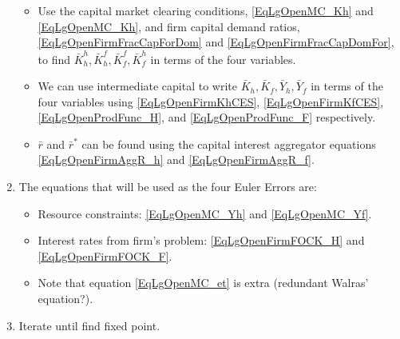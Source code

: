 \documentclass[letterpaper,12pt]{article}
\theoremstyle{definition}
\begin{document}
\begin{enumerate}
\begin{itemize}
        \item Use the capital market clearing conditions, \eqref{EqLgOpenMC_Kh} and \eqref{EqLgOpenMC_Kh}, and firm capital demand ratios,  \eqref{EqLgOpenFirmFracCapForDom} and \eqref{EqLgOpenFirmFracCapDomFor}, to find $\bar{K}_h^h, \bar{K}_h^f, \bar{K}_f^f, \bar{K}_f^h$ in terms of the four variables.
        \item We can use intermediate capital to write $\bar{K}_h, \bar{K}_f, \bar{Y}_h, \bar{Y}_f$ in terms of the four variables using \eqref{EqLgOpenFirmKhCES}, \eqref{EqLgOpenFirmKfCES}, \eqref{EqLgOpenProdFunc_H}, and \eqref{EqLgOpenProdFunc_F} respectively.
        \item $\bar{r}$ and $\bar{r}^*$ can be found using the capital interest aggregator equations \eqref{EqLgOpenFirmAggR_h} and \eqref{EqLgOpenFirmAggR_f}.
      \end{itemize}
      \item The equations that will be used as the four Euler Errors are:
      \begin{itemize}
        \item Resource constraints: \eqref{EqLgOpenMC_Yh} and \eqref{EqLgOpenMC_Yf}.
        \item Interest rates from firm's problem: \eqref{EqLgOpenFirmFOCK_H} and \eqref{EqLgOpenFirmFOCK_F}.
        \item Note that equation \eqref{EqLgOpenMC_et} is extra (redundant Walras' equation?).
      \end{itemize}
      \item Iterate until find fixed point.
    \end{enumerate}
\end{document}
